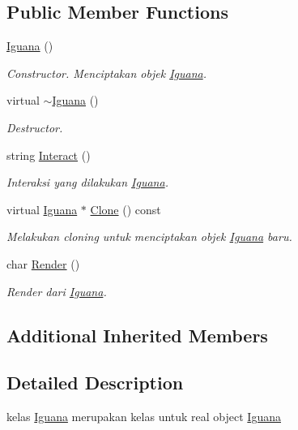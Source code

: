 \subsection*{Public Member Functions}
\begin{DoxyCompactItemize}
\item 
\hyperlink{classIguana_aadc10a5bb8364d915bfd1d3d8ab3156a}{Iguana} ()
\begin{DoxyCompactList}\small\item\em Constructor. Menciptakan objek \hyperlink{classIguana}{Iguana}. \end{DoxyCompactList}\item 
virtual \hyperlink{classIguana_af0a4082cc22aea6f76f42c859d9375ad}{$\sim$\+Iguana} ()
\begin{DoxyCompactList}\small\item\em Destructor. \end{DoxyCompactList}\item 
string \hyperlink{classIguana_a271ef320fd3d4973e50e89aa30cffe3e}{Interact} ()
\begin{DoxyCompactList}\small\item\em Interaksi yang dilakukan \hyperlink{classIguana}{Iguana}. \end{DoxyCompactList}\item 
virtual \hyperlink{classIguana}{Iguana} $\ast$ \hyperlink{classIguana_a40e56fb855d09d2a8788dc73e2fdfc8a}{Clone} () const 
\begin{DoxyCompactList}\small\item\em Melakukan cloning untuk menciptakan objek \hyperlink{classIguana}{Iguana} baru. \end{DoxyCompactList}\item 
char \hyperlink{classIguana_a18bbb71a80e6b2a9855623b1c7f108b9}{Render} ()
\begin{DoxyCompactList}\small\item\em Render dari \hyperlink{classIguana}{Iguana}. \end{DoxyCompactList}\end{DoxyCompactItemize}
\subsection*{Additional Inherited Members}


\subsection{Detailed Description}
kelas \hyperlink{classIguana}{Iguana} merupakan kelas untuk real object \hyperlink{classIguana}{Iguana} 

